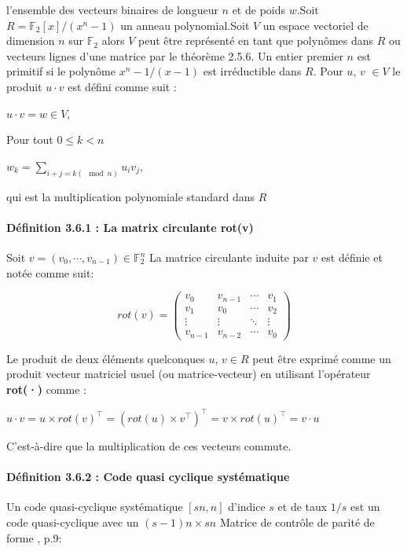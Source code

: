 \documentclass[12pt,openany]{report}
\begin{document}
l'ensemble des vecteurs binaires de longueur $n$ et de poids $w$.Soit $\mathit{R}=\mathbb{F}_2[x]/(x^n-1)$ un anneau polynomial.Soit $\mathit{V}$   un espace vectoriel de dimension $n$ sur $\mathbb{F}_2$ alors $\mathit{V}$ peut être représenté en tant que polynômes dans $\mathit{R}$ ou vecteurs lignes d’une matrice par le théorème 2.5.6. Un
entier premier $n$ est primitif si le polynôme $x^n-1/(x-1)$ est irréductible dans $\mathit{R}$. Pour
$u$, $v$ $\in V$ le produit $u \cdot v$ est défini comme suit :

\begin{center}
$ 
  u \cdot v = w \in \mathit{V}
$,
\end{center}
Pour tout $ 0\leq k<n$
\begin{center}
$ 
 w_k = \sum_{i+j=k (\mod n)} u_iv_j
$,
\end{center}
qui est la multiplication polynomiale standard dans $\mathit{R} $
\paragraph{Définition 3.6.1 : La matrix circulante  rot(v)\hspace{0.3cm} }\cite{melchor2020}
Soit $ v= (v_0,\cdots,v_{n-1}) \in \mathbb{F}_2^n $
 La matrice circulante induite par $v$ est définie et notée comme suit:
 
 \begin{center}
 $$ rot(v)=  \begin{pmatrix}
v_0 & v_{n-1} & \cdots & v_1 \\
v_1 & v_0 & \cdots & v_2 \\
\vdots & \vdots & \ddots & \vdots \\
v_{n-1} &v_{n-2} & \cdots & v_0
\end{pmatrix}$$
 \end{center}
 
 Le produit de deux éléments quelconques $u$, $v \in \mathit{R}$ peut être exprimé comme un produit vecteur matriciel usuel (ou matrice-vecteur) en utilisant l’opérateur \textbf{rot(·)}  comme :
 
 \begin{center}
 $
u\cdot v =u \times rot(v)^{\top}=(rot(u)\times v^{\top})^{\top }= v \times rot(u)^{\top}= v \cdot u$
 \end{center}
 C’est-à-dire que la multiplication de ces vecteurs commute.
 \paragraph{Définition 3.6.2 : Code quasi cyclique systématique }
 Un code quasi-cyclique systématique $[sn, n]$ d’indice $s$ et de taux $1/s$ est un code quasi-cyclique avec un $(s-1)n \times sn$
Matrice de contrôle de parité de forme \cite{melchor2020} , p.9:
\end{document}
